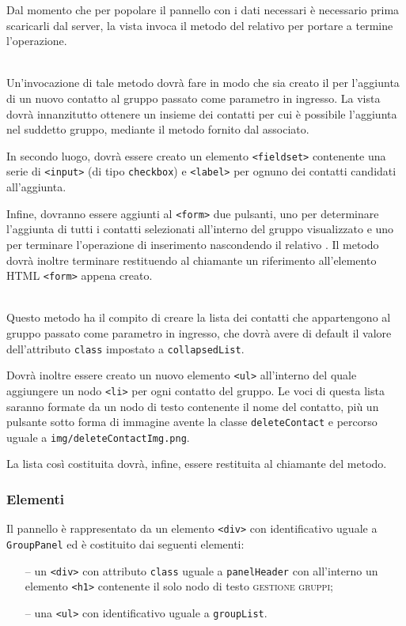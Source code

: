 \begin{description}
  Dal momento che per popolare il pannello con i dati necessari è necessario prima scaricarli dal server, la vista invoca il metodo  del relativo  per portare a termine l'operazione.
  
  \item{}\\
  Un'invocazione di tale metodo dovrà fare in modo che sia creato il  per l'aggiunta di un nuovo contatto al gruppo passato come parametro in ingresso. La vista dovrà innanzitutto ottenere un insieme dei contatti per cui è possibile l'aggiunta nel suddetto gruppo, mediante il metodo  fornito dal  associato.
  
  In secondo luogo, dovrà essere creato un elemento \verb'<fieldset>' contenente una serie di \verb'<input>' (di tipo \verb'checkbox') e \verb'<label>' per ognuno dei contatti candidati all'aggiunta.
  
  Infine, dovranno essere aggiunti al \verb'<form>' due pulsanti, uno per determinare l'aggiunta di tutti i contatti selezionati all'interno del gruppo visualizzato e uno per terminare l'operazione di inserimento nascondendo il relativo . Il metodo dovrà inoltre terminare restituendo al chiamante un riferimento all'elemento HTML \verb'<form>' appena creato.
  
  \item{}\\
  Questo metodo ha il compito di creare la lista dei contatti che appartengono al gruppo passato come parametro in ingresso, che dovrà avere di default il valore dell'attributo \verb'class' impostato a \verb'collapsedList'.
  
  Dovrà inoltre essere creato un nuovo elemento \verb'<ul>' all'interno del quale aggiungere un nodo \verb'<li>' per ogni contatto del gruppo. Le voci di questa lista saranno formate da un nodo di testo contenente il nome del contatto, più un pulsante sotto forma di immagine avente la classe \verb'deleteContact' e percorso uguale a \verb'img/deleteContactImg.png'.
  
  La lista così costituita dovrà, infine, essere restituita al chiamante del metodo.

\end{description}

\subsubsection*{Elementi}
Il pannello è rappresentato da un elemento \verb'<div>' con identificativo uguale a \verb'GroupPanel' ed è costituito dai seguenti elementi:
\begin{itemize}
  \item[--] un \verb'<div>' con attributo \verb'class' uguale a \verb'panelHeader' con all'interno un elemento \verb'<h1>' contenente il solo nodo di testo \textsc{gestione gruppi};
  \item[--] una \verb'<ul>' con identificativo uguale a \verb'groupList'.
\end{itemize}


